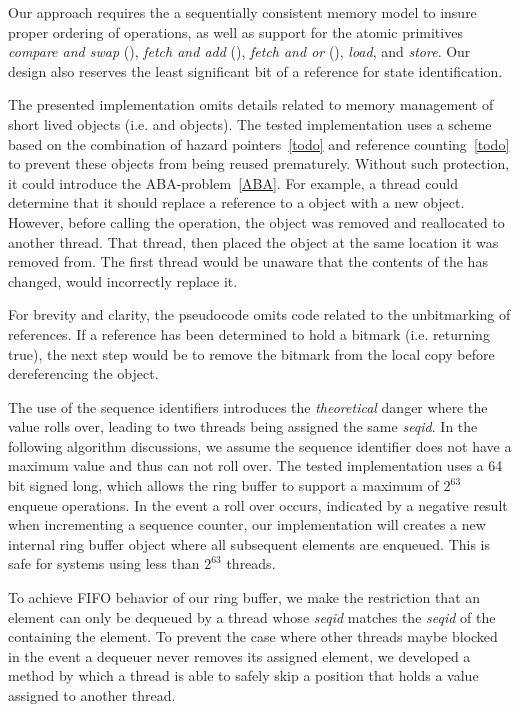 
Our approach requires the a sequentially consistent memory model to insure proper ordering of operations, as well as support for the atomic primitives \textit{compare and swap} (), \textit{fetch and add} (), \textit{fetch and or} (), \textit{load}, and \textit{store}.
Our design also reserves the least significant bit of a reference for state identification.

The presented implementation omits details related to memory management of short lived objects (i.e.  and  objects).
The tested implementation uses a scheme based on the combination of hazard pointers~\ref{todo} and reference counting~\ref{todo} to prevent these objects from being reused prematurely.
Without such protection, it could introduce the ABA-problem~\ref{ABA}. 
For example, a thread could determine that it should replace a reference to a  object with a new  object.
However, before calling the  operation, the object was removed and reallocated to another thread.
That thread, then placed the object at the same location it was removed from.
The first thread would be unaware that the contents of the  has changed, would incorrectly replace it.

For brevity and clarity, the pseudocode omits code related to the unbitmarking of references.
If a reference has been determined to hold a bitmark (i.e.  returning true), the next step would be to remove the bitmark from the local copy before dereferencing the object.

The use of the sequence identifiers introduces the \textit{theoretical} danger where the value rolls over, leading to two threads being assigned the same \emph{seqid}.
In the following algorithm discussions, we assume the sequence identifier does not have a maximum value and thus can not roll over.
The tested implementation uses a 64 bit signed long, which allows the ring buffer to support a maximum of $2^{63}$ enqueue operations.
In the event a roll over occurs, indicated by a negative result when incrementing a sequence counter, our implementation will creates a new internal ring buffer object where all subsequent elements are enqueued.
This is safe for systems using less than $2^{63}$ threads.

To achieve FIFO behavior of our ring buffer, we make the restriction that an element can only be dequeued by a thread whose \emph{seqid} matches the \emph{seqid} of the  containing the element.
To prevent the case where other threads maybe blocked in the event a dequeuer never removes its assigned element, we developed a method by which a thread is able to safely skip a position that holds a value assigned to another thread.